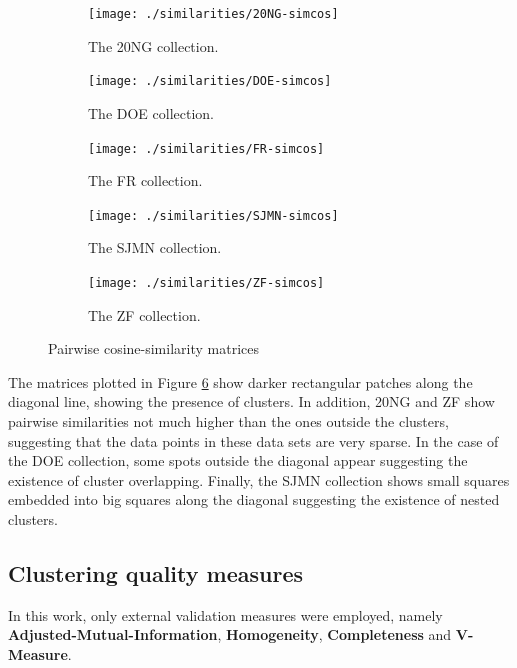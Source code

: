 \documentclass[smallextended]{svjour3}       %
\begin{document}
\begin{figure}[!htbp]
    \centering
    \begin{subfigure}[b]{0.33\textwidth}
        \texttt{[image: ./similarities/20NG-simcos]}
        \caption{The 20NG collection.}
        \label{fig:20ng_sim}
    \end{subfigure}
    \begin{subfigure}[b]{0.33\textwidth}
        \texttt{[image: ./similarities/DOE-simcos]}
        \caption{The DOE collection.}
        \label{fig:doe_sim}
    \end{subfigure}
    \begin{subfigure}[b]{0.33\textwidth}
        \texttt{[image: ./similarities/FR-simcos]}
        \caption{The FR collection.}
        \label{fig:fr_sim}
    \end{subfigure}
    \begin{subfigure}[b]{0.33\textwidth}
        \texttt{[image: ./similarities/SJMN-simcos]}
        \caption{The SJMN collection.}
        \label{fig:sjmn_sim}
    \end{subfigure}
    \begin{subfigure}[b]{0.33\textwidth}
        \texttt{[image: ./similarities/ZF-simcos]}
        \caption{The ZF collection.}
        \label{fig:zf_sim}
    \end{subfigure}    
    \caption{Pairwise cosine-similarity matrices}\label{fig:sim_matrices}
\end{figure}

The matrices plotted in Figure \ref{fig:sim_matrices} show darker rectangular patches along the diagonal line, showing the presence of clusters. 
In addition, 20NG and ZF show pairwise similarities not much higher than the ones outside the clusters, suggesting that the data points in these data sets are very sparse. 
In the case of the DOE collection, some spots outside the diagonal appear suggesting the existence of cluster overlapping.
Finally, the SJMN collection shows small squares embedded into big squares along the diagonal suggesting the existence of nested clusters.

\subsection*{Clustering quality measures}

In this work, only external validation measures were employed, namely \textbf{Adjusted-Mutual-Information}, \textbf{Homogeneity}, \textbf{Completeness} and  \textbf{V-Measure}. 
\end{document}
